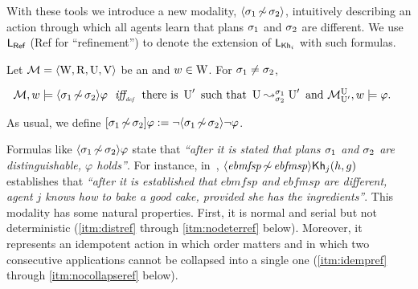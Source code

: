 \medskip

With these tools we introduce a new modality, $\langle \sigma_1{\,\not\sim\,}\sigma_2 \rangle$, intuitively describing an action through which all agents learn that plans $\sigma_1$ and
$\sigma_2$ are different. We use $\mathsf{L_{Ref}}$ ({\small\textsf{Ref}} for ``refinement'') to denote the extension of $\mathsf{L}_{{\sf Kh}_i}$ with such formulas.

\medskip

\begin{definition}\label{def:ref-sem}
Let $\mathcal{M}=\langle \operatorname{W},\operatorname{R},\operatorname{U},\operatorname{V} \rangle$ be an \ults and $w \in \operatorname{W}$.
For $\sigma_1\neq\sigma_2$,
\begin{spcenter}
$\begin{array}{l@{\ \ }c@{\ \ }l}
\modults,w\models \refdiam{\plan_1}{\plan_2}\varphi & \iffdef & \text{there is } \Unc' \text{ such that } \splitstr{\Unc}{\Unc'}{\plan_1}{\plan_2} \text{ and }  \modults^{\Unc}_{\Unc'},w \models \varphi.
\end{array}$
\end{spcenter}
As usual, we define $[{\sigma_1{\,\not\sim\,}\sigma_2}]\varphi := \lnot \langle \sigma_1{\,\not\sim\,}\sigma_2 \rangle\lnot\varphi$.
\end{definition}

\medskip

Formulas like $\langle \sigma_1{\,\not\sim\,}\sigma_2 \rangle\varphi$ state that \emph{``after it is stated that plans $\sigma_1$ and $\sigma_2$ are distinguishable, $\varphi$ holds''}. For instance, in~, $\langle \mathit{ebmfsp}{\,\not\sim\,}\mathit{ebfmsp} \rangle{\sf Kh}_j(h,g)$ establishes that \emph{``after it is established that $\mathit{ebmfsp}$ and $\mathit{ebfmsp}$ are different, agent $j$ knows how to bake a good cake, provided she has the ingredients''}. This modality has some natural properties. First, it is normal and serial but not deterministic (\ref{itm:distref} through \ref{itm:nodeterref} below). Moreover, it represents an idempotent action in which order matters and in which two consecutive applications cannot be collapsed into a single one (\ref{itm:idempref} through \ref{itm:nocollapseref} below). 

\medskip

